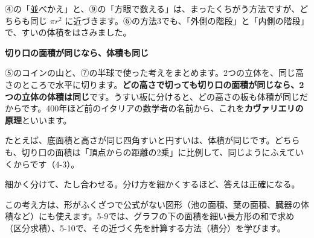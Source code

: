 ④の「並べかえ」と、⑨の「方眼で数える」は、まったくちがう方法ですが、どちらも同じ $\pi r^2$ に近づきます。⑥の方法3でも、「外側の階段」と「内側の階段」で、すいの体積をはさみました。

\begin{motto}[2]
\textbf{切り口の面積が同じなら、体積も同じ}\par
\noindent\begin{minipage}[c]{0.6\linewidth}
⑤のコインの山と、⑦の半球で使った考えをまとめます。2つの立体を、同じ高さのところで水平に切ります。\textbf{どの高さで切っても切り口の面積が同じなら、2つの立体の体積は同じ}です。うすい板に分けると、どの高さの板も体積が同じだからです。400年ほど前のイタリアの数学者の名前から、これを\textbf{カヴァリエリの原理}といいます。

たとえば、底面積と高さが同じ四角すいと円すいは、体積が同じです。どちらも、切り口の面積は「頂点からの距離の2乗」に比例して、同じようにふえていくからです（4-3）。
\end{minipage}\hfill
\begin{minipage}[c]{0.36\linewidth}\centering
{}
\end{minipage}
\end{motto}

\begin{taisetsu}
細かく分けて、たし合わせる。分け方を細かくするほど、答えは正確になる。
\end{taisetsu}

\noindent この考え方は、形がふくざつで公式がない図形（池の面積、葉の面積、臓器の体積など）にも使えます。5-9では、グラフの下の面積を細い長方形の和で求め（区分求積）、5-10で、その近づく先を計算する方法（積分）を学びます。

